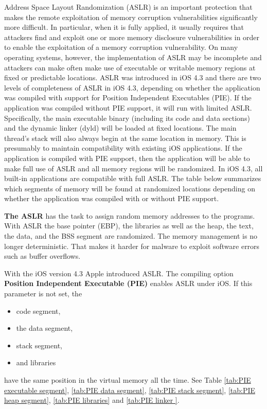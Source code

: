 Address Space Layout Randomization (ASLR) is an important protection that makes the remote exploitation of memory corruption vulnerabilities significantly more difficult. In particular, when it is fully applied, it usually requires that attackers find and exploit one or more memory disclosure vulnerabilities in order to enable the exploitation of a memory corruption vulnerability. On many operating systems, however, the implementation of ASLR may be incomplete and attackers can make often make use of executable or writable memory regions at fixed or predictable locations.
ASLR was introduced in iOS 4.3 and there are two levels of completeness of ASLR in iOS 4.3, depending on whether the application was compiled with support for Position Independent Executables (PIE). If the application was compiled without PIE support, it will run with limited ASLR. Specifically, the main executable binary (including its code and data sections) and the dynamic linker (dyld) will be loaded at fixed locations. The main thread’s stack will also always begin at the same location in memory. This is presumably to maintain compatibility with existing iOS applications. If the application is compiled with PIE support, then the application will be able to make full use of ASLR and all memory regions will be randomized. In iOS 4.3, all built-in applications are compatible with full ASLR. The table below summarizes which segments of memory will be found at randomized locations depending on whether the application was compiled with or without PIE support.

\textbf{The ASLR} has the task to assign random memory addresses to the programs. With ASLR the base pointer (EBP), the libraries as well as the heap, the text, the data, and the BSS segment are randomized. The memory management is no longer deterministic. That makes it harder for malware to exploit software errors such as buffer overflows. \cite{Apple[4], ASLR[1]} \par
 With the iOS version 4.3 Apple introduced ASLR. The compiling option \textbf{Position Independent Executable (PIE)} enables ASLR under iOS. 
If this parameter is not set, the 
\begin{itemize}
    \item code segment, 
    \item the data segment, 
    \item stack segment,
    \item and libraries
\end{itemize}
have the same position in the virtual memory all the time. See Table \ref{tab:PIE executable segment}, \ref{tab:PIE data segment}, \ref{tab:PIE stack segment}, \ref{tab:PIE heap segment}, \ref{tab:PIE libraries} and \ref{tab:PIE linker }. 


